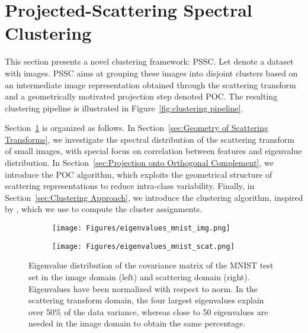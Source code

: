 \documentclass[11pt]{article}
\theoremstyle{definition}
\newcommand{\Figure}[1]{Figure~\ref{#1}}
\newcommand{\Section}[1]{Section~\ref{#1}}
\begin{document}
\section{Projected-Scattering Spectral Clustering}\label{sec:Scattering Projected Spectral Clustering}

This section presents a novel clustering framework: PSSC. Let  denote a dataset with  images. PSSC aims at grouping these images into  disjoint clusters based on an intermediate image representation obtained through the scattering transform and a geometrically motivated projection step denoted POC. The resulting clustering pipeline is illustrated in \Figure{fig:clustering pipeline}.

\Section{sec:Scattering Projected Spectral Clustering} is organized as follows. In \Section{sec:Geometry of Scattering Transforms}, we investigate the spectral distribution of the scattering transform of small images, with special focus on correlation between features and eigenvalue distribution. In \Section{sec:Projection onto Orthogonal Complement}, we introduce the POC algorithm, which exploits the geometrical structure of scattering representations to reduce intra-class variability. Finally, in \Section{sec:Clustering Approach}, we introduce the clustering algorithm, inspired by \cite{Huang_UltraScalableSpectralClustering_2019}, which we use to compute the cluster assignments.




\begin{figure}[b]	
	\hspace{0.05\textwidth}
	\begin{subfigure}{0.3\textwidth}
		\hspace*{0\textwidth}
\texttt{[image: Figures/eigenvalues\_mnist\_img.png]}
		\label{fig:subfig1}
	\end{subfigure}
	\hspace{0.15\textwidth}
	\begin{subfigure}{0.3\textwidth}
		\centering
		\texttt{[image: Figures/eigenvalues\_mnist\_scat.png]}
		\label{fig:subfig2}
	\end{subfigure}
	\hspace{0.1\textwidth}
	\vspace{-0.7cm}
	\caption{Eigenvalue distribution of the covariance matrix of the MNIST test set in the image domain (left) and scattering domain (right). Eigenvalues have been normalized with respect to  norm. In the scattering transform domain, the four largest eigenvalues explain over 50\% of the data variance, whereas close to 50 eigenvalues are needed in the image domain to obtain the same percentage.}
	\label{fig:eigenvalues mnist dataset}
\end{figure}
\end{document}
